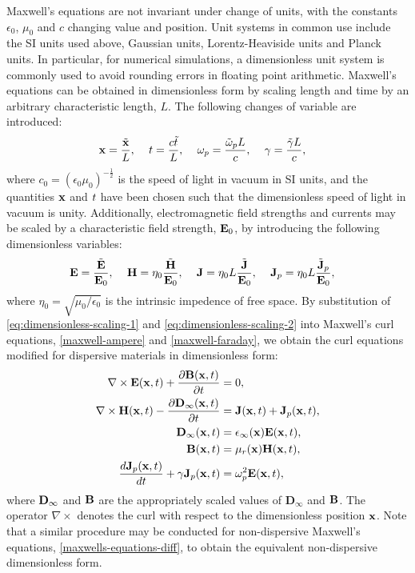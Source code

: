 Maxwell's equations are not invariant under change of units, with the constants $\epsilon_0$, $\mu_0$ and $c$ changing value and position. Unit systems in common use include the SI units used above, Gaussian units, Lorentz-Heaviside units and Planck units.
In particular, for numerical simulations, a dimensionless unit system is commonly used to avoid rounding errors in floating point arithmetic. Maxwell's equations can be obtained in dimensionless form by scaling length and time by an arbitrary characteristic length, $L$. The following changes of variable are introduced:
    \begin{align}
        \label{eq:dimensionless-scaling-1}
        \mathbf{x} &= \frac{\tilde{\mathbf{x}}}{L}, &  \
        t &= \frac{c \tilde{t}}{L}, &  \
        \omega_p &= \frac{\tilde{\omega}_p L}{c}, & \
        \gamma &= \frac{\tilde{\gamma} L}{c},
    \end{align}
where $c_0 = ( \epsilon_0 \mu_0 )^{-\frac{1}{2}}$ is the speed of light in vacuum in SI units, and the quantities $\mathbf{x}$ and $t$ have been chosen such that the dimensionless speed of light in vacuum is unity. Additionally, electromagnetic field strengths and currents may be scaled by a characteristic field strength, $\mathbf{E}_0$, by introducing the following dimensionless variables:
    \begin{align}
        \label{eq:dimensionless-scaling-2}
        \mathbf{E} &= \frac{\tilde{\mathbf{E}}}{\mathbf{E}_0}, &  \
        \mathbf{H} &= \eta_0 \frac{\tilde{\mathbf{H}}}{\mathbf{E}_0}, &  \
        \mathbf{J} &= \eta_0 L \frac{\tilde{\mathbf{J}}}{\mathbf{E}_0}, & \
        \mathbf{J}_p &= \eta_0 L \frac{\tilde{\mathbf{J}}_p}{\mathbf{E}_0},
    \end{align}
    where $\eta_0 = \sqrt{\mu_0 / \epsilon_0}$ is the intrinsic impedence of free space. By substitution of \eqref{eq:dimensionless-scaling-1} and \eqref{eq:dimensionless-scaling-2} into Maxwell's curl equations, \eqref{maxwell-ampere} and \eqref{maxwell-faraday}, we obtain the curl equations modified for dispersive materials in dimensionless form:
\begin{subequations}
    \label{eq:dimensionless-maxwell}
    \begin{align}
        \nabla \times \mathbf{E}(\mathbf{x},t) + \frac{\partial \mathbf{B}(\mathbf{x}, t) }{\partial t} &= 0, \\
        \nabla \times \mathbf{H}(\mathbf{x},t) - \frac{\partial  \mathbf{D}_{\infty}(\mathbf{x}, t) }{\partial t} &= \mathbf{J}(\mathbf{x},t) + \mathbf{J}_p(\mathbf{x},t), \\
        \mathbf{D}_{\infty}(\mathbf{x},t) &= \epsilon_{\infty}(\mathbf{x}) \mathbf{E}(\mathbf{x},t), \\
        \mathbf{B}(\mathbf{x},t) &= \mu_r(\mathbf{x}) \mathbf{H}(\mathbf{x},t), \\
        \frac{d \mathbf{J}_p(\mathbf{x},t)}{dt} + \gamma \mathbf{J}_p(\mathbf{x},t) &= \omega_p^2 \mathbf{E}(\mathbf{x},t),
    \end{align}
\end{subequations}
where $\mathbf{D}_{\infty}$ and $\mathbf{B}$ are the appropriately scaled values of $\mathbf{D}_{\infty}$ and $\mathbf{B}$. The operator $\nabla \times$ denotes the curl with respect to the dimensionless position $\mathbf{x}$. Note that a similar procedure may be conducted for non-dispersive Maxwell's equations, \eqref{maxwells-equations-diff}, to obtain the equivalent non-dispersive dimensionless form.


